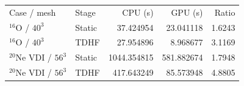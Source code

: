 \begin{tabular}{llrrr}
\toprule
Case / mesh & Stage & CPU (s) & GPU (s) & Ratio \\
$^{16}$O / $40^3$ & Static & 37.424954 & 23.041118 & 1.6243 \\
$^{16}$O / $40^3$ & TDHF & 27.954896 & 8.968677 & 3.1169 \\
$^{20}$Ne VDI / $56^3$ & Static & 1044.354815 & 581.882674 & 1.7948 \\
$^{20}$Ne VDI / $56^3$ & TDHF & 417.643249 & 85.573948 & 4.8805 \\
\bottomrule
\end{tabular}
